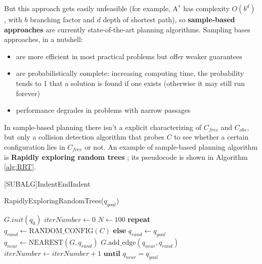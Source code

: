 But this approach gets easily unfeasible (for example, A$^*$ has complexity $O(b^d)$ \parencite{aStar}, with $b$ branching factor and $d$ depth of shortest path), so \textbf{sample-based approaches} are currently state-of-the-art planning algorithms. Sampling bases approaches, in a nutshell:
\begin{itemize}
	\item are more efficient in most practical problems but offer  weaker guarantees
	\item are probabilistically complete: increasing computing time, the probability tends to 1 that a solution is found if one exists (otherwise it may still run forever)
	\item performance degrades in problems with narrow passages
\end{itemize}
In sample-based planning there isn't a explicit characterizing of $C_{free}$ and $C_{obs}$, but only a collision detection algorithm that probes $C$ to see whether a certain configuration lies in $C_{free}$ or not. An example of sample-based planning algorithm is \textbf{Rapidly exploring random trees} \parencite{RRT}; its pseudocode is shown in Algorithm \ref{alg:RRT}.

[SUBALG]{Indent}{EndIndent}{}{\algorithmicend\ }%

\begin{algorithm}
\caption{RapidlyExploringRandomTrees($q_{goal}$)}\label{alg:RRT}
\begin{algorithmic}[1]
\State $\textit{G.init}(q_0)$
\State $\textit{iterNumber} \gets 0$ 
\State $\textit{N} \gets 100$  
\State \textbf{repeat}
\Indent
		\State $q_{rand} \gets \text{RANDOM\_CONFIG}(C)$
	\EndIf
	\State \textbf{else}
	\Indent
		\State  $q_{rand} \gets q_{goal}$
	\EndIndent
	\State $q_{near} \gets \text{NEAREST}(G, q_{rand})$
	\State $G.\text{add\_edge}(q_{near},q_{rand})$
	\State $\textit{iterNumber} \gets \textit{iterNumber}+1$ 
\EndIndent
\State $\textbf{until } q_{near} = q_{goal}$
\end{algorithmic}
\end{algorithm}

